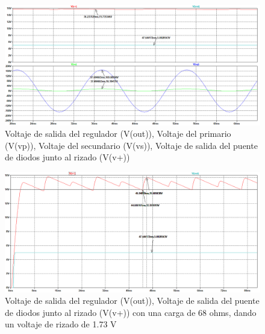 \begin{enumerate}
\begin{enumerate}
\begin{itemize}
                            \begin{figure}[H]
                                \centering
                                \renewcommand{\figurename}{Gráfica}
                                \setcounter{figure}{20}
                                \includegraphics[width=15cm]{Imagenes/sim_reg_sinct.png}
                                \caption{Voltaje de salida del regulador (V(out)), Voltaje del primario (V(vp)), Voltaje del secundario (V(vs)), Voltaje de salida del puente de diodos junto al rizado (V(v+))}
                                \label{fig:sim_reg_sinct}
                            \end{figure}
        
        
                            \begin{figure}[H]
                                \centering
                                \renewcommand{\figurename}{Gráfica}
                                \includegraphics[width=15cm]{Imagenes/sim_reg_sinct_rl.png}
                                \caption{Voltaje de salida del regulador (V(out)), Voltaje de salida del puente de diodos junto al rizado (V(v+)) con una carga de 68 ohms, dando un voltaje de rizado de 1.73 V}
                                \label{fig:sim_reg_sinct_rl}
                            \end{figure}
        

\end{itemize}
\end{enumerate}
\end{enumerate}
